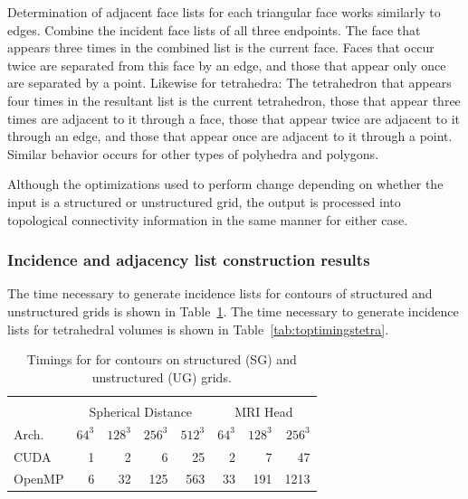 \documentclass[10pt,journal,cspaper,compsoc]{IEEEtran}
\begin{document}
Determination of adjacent face lists for each triangular face works similarly to edges. Combine the incident face lists of all three endpoints. The face that appears three times in the combined list is the current face. Faces that occur twice are separated from this face by an edge, and those that appear only once are separated by a point.
Likewise for tetrahedra: The tetrahedron that appears four times in the resultant list is the current tetrahedron, those that appear three times are adjacent to it through a face, those that appear twice are adjacent to it through an edge, and those that appear once are adjacent to it through a point. Similar behavior occurs for other types of polyhedra and polygons.

Although the optimizations used to perform  change depending on whether the input is a structured or unstructured grid, the output is processed into topological connectivity information in the same manner for either case.

\subsubsection{Incidence and adjacency list construction results}
The time necessary to generate incidence lists for contours of structured and unstructured grids is shown in Table~\ref{tab:toptimings}. The time necessary to generate incidence lists for tetrahedral volumes is shown in Table~\ref{tab:toptimingstetra}.

\begin{table}[tb!]
\begin{center}
\caption{Timings for  for contours on structured (SG) and unstructured (UG) grids.}
\label{tab:toptimings}
\begin{tabular}{l|r r r r|r r r}
\multicolumn{8}{c}{ } \\
 & \multicolumn{4}{|c|}{Spherical Distance} & \multicolumn{3}{|c}{MRI Head}\\
Arch. & $64^3$ & $128^3$ & $256^3$ & $512^3$ & $64^3$ & $128^3$ & $256^3$\\
\hline
CUDA & 1 & 2 & 6 & 25 & 2 & 7 & 47 \\
OpenMP & 6 & 32 & 125 & 563 & 33 & 191 & 1213 \\
\end{tabular}
\end{center}
\end{table}
\end{document}
